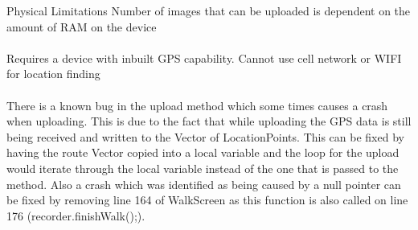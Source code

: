 \documentclass[12pt]{article}
\makeatletter
\renewcommand{\paragraph}{
  \@startsection{paragraph}{4}
  {\z@}{3.25ex \@plus -10em \@minus 1em}{0.1em}
  {\normalfont\normalsize\bfseries}
}
\makeatother
\begin{document}
\paragraph{Physical Limitations}
Number of images that can be uploaded is dependent on the amount of RAM on the device
\\\\
Requires a device with inbuilt GPS capability. Cannot use cell network or WIFI for location finding
\\\\
There is a known bug in the upload method which some times causes a crash when uploading. This is due to the fact that while uploading the GPS data is still being received and written to the Vector of LocationPoints. This can be fixed by having the route Vector copied into a local variable and the loop for the upload would iterate through the local variable instead of the one that is passed to the method.
\newline
Also a crash which was identified as being caused by a null pointer can be fixed by removing line 164 of WalkScreen as this function is also called on line 176 (recorder.finishWalk();).
\end{document}

